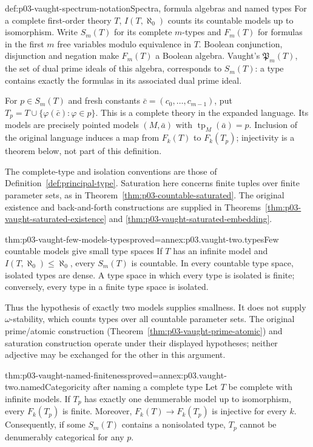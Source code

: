 \begin{hbdefinition}{def:p03-vaught-spectrum-notation}{Spectra, formula algebras and named types}
For a complete first-order theory \(T\), \(I(T,\aleph_0)\) counts its
countable models up to isomorphism. Write \(S_m(T)\) for its complete
\(m\)-types and \(F_m(T)\) for formulas in the first \(m\) free variables
modulo equivalence in \(T\). Boolean conjunction, disjunction and negation
make \(F_m(T)\) a Boolean algebra. Vaught's \(\mathfrak P_m(T)\), the set
of dual prime ideals of this algebra, corresponds to \(S_m(T)\): a type
contains exactly the formulas in its associated dual prime ideal.

For \(p\in S_m(T)\) and fresh constants \(\bar c=(c_0,\ldots,c_{m-1})\),
put \(T_p=T\cup\{\varphi(\bar c):\varphi\in p\}\).
This is a complete theory in the expanded language. Its models are precisely
pointed models \((M,\bar a)\) with \(\operatorname{tp}_M(\bar a)=p\).
Inclusion of the original language induces a map from \(F_k(T)\) to
\(F_k(T_p)\); injectivity is a theorem below, not part of this definition.
\end{hbdefinition}

The complete-type and isolation conventions are those of
Definition~\ref{def:principal-type}. Saturation here concerns finite tuples
over finite parameter sets, as in Theorem~\ref{thm:p03-countable-saturated}.
The original existence and back-and-forth constructions are supplied in
Theorems~\ref{thm:p03-vaught-saturated-existence} and
\ref{thm:p03-vaught-saturated-embedding}.

\begin{hblemma}{thm:p03-vaught-few-models-types}{proved=annex:p03.vaught-two.types}{Few countable models give small type spaces}
If \(T\) has an infinite model and \(I(T,\aleph_0)\leq\aleph_0\), every
\(S_m(T)\) is countable. In every countable type space, isolated types are
dense. A type space in which every type is isolated is finite; conversely,
every type in a finite type space is isolated.
\end{hblemma}

Thus the hypothesis of exactly two models supplies smallness. It does not
supply \(\omega\)-stability, which counts types over all countable parameter
sets. The original prime/atomic construction
(Theorem~\ref{thm:p03-vaught-prime-atomic}) and saturation construction
operate under their displayed hypotheses; neither adjective may be exchanged
for the other in this argument.

\begin{hblemma}{thm:p03-vaught-named-finiteness}{proved=annex:p03.vaught-two.named}{Categoricity after naming a complete type}
Let \(T\) be complete with infinite models. If \(T_p\) has exactly one
denumerable model up to isomorphism, every \(F_k(T_p)\) is finite.
Moreover, \(F_k(T)\to F_k(T_p)\) is injective for every \(k\).
Consequently, if some \(S_m(T)\) contains a nonisolated type, \(T_p\)
cannot be denumerably categorical for any \(p\).
\end{hblemma}

